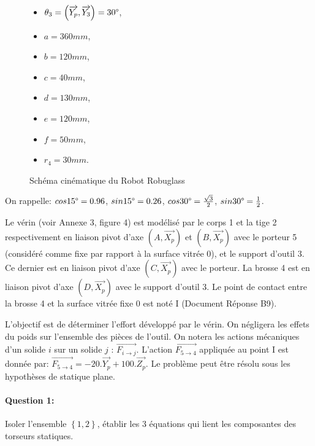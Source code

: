 \begin{figure}[!h]
\begin{minipage}{0.3\linewidth}
\begin{itemize}
   \item $\theta_3=\left(\overrightarrow{Y_p},\overrightarrow{Y_3}\right)=30\degree$,
   \end{itemize}
 \end{minipage}
  \hfill
 \begin{minipage}{0.25\linewidth}
  \begin{itemize}
   \item $a=360mm$,
   \item $b=120mm$,
   \item $c=40mm$,
   \item $d=130mm$,
   \item $e=120mm$,
   \item $f=50mm$,
   \item $r_4=30mm$.
   \end{itemize}
 \end{minipage}
 \caption{Schéma cinématique du Robot Robuglass}
 \label{robuglass_cin}
\end{figure}

On rappelle: $cos15\degree=0.96$, $sin15\degree=0.26$, $cos30\degree=\frac{\sqrt{3}}{2}$, $sin30\degree=\frac{1}{2}$.
 
Le vérin (voir Annexe 3, figure 4) est modélisé par le corps 1 et la tige 2 respectivement en liaison pivot d'axe $(A,\overrightarrow{X_p})$ et $(B,\overrightarrow{X_p})$ avec le porteur 5 (considéré comme fixe par rapport à la surface vitrée 0), et le support d'outil 3. Ce dernier est en liaison pivot d'axe $(C,\overrightarrow{X_p})$ avec le porteur. La brosse 4 est en liaison pivot d'axe $(D,\overrightarrow{X_p})$ avec le support d'outil 3. Le point de contact entre la brosse 4 et la surface vitrée fixe 0 est noté I (Document Réponse B9). 

L'objectif est de déterminer l'effort développé par le vérin. On négligera les effets du poids sur l'ensemble des pièces de l'outil. On notera les actions mécaniques d'un solide $i$ sur un solide $j$ : $\overrightarrow{F_{i\rightarrow j}}$. L'action  $\overrightarrow{F_{5\rightarrow 4}}$ appliquée au point I est donnée par: $\overrightarrow{F_{5\rightarrow 4}}=-20.\overrightarrow{Y_p}+100.\overrightarrow{Z_p}$. Le problème peut être résolu sous les hypothèses de statique plane. 
 
\paragraph{Question 1:} Isoler l'ensemble $\left\{1,2\right\}$, établir les 3 équations qui lient les composantes des torseurs statiques.

